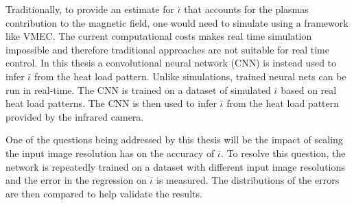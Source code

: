 Traditionally, to provide an estimate for $\bar{\iota}$ that accounts for the plasmas contribution to the magnetic field, one would need to simulate using a framework like VMEC. The current computational costs makes real time simulation impossible and therefore traditional approaches are not suitable for real time control. In this thesis a convolutional neural network (CNN) is instead used to infer $\bar{\iota}$ from the heat load pattern. Unlike simulations, trained neural nets can be run in real-time. The CNN is trained on a dataset of simulated $\bar{\iota}$ based on real heat load patterns. The CNN is then used to infer $\bar{\iota}$ from the heat load pattern provided by the infrared camera.

One of the questions being addressed by this thesis will be the impact of scaling the input image resolution has on the accuracy of $\bar{\iota}$. To resolve this question, the network is repeatedly trained on a dataset with different input image resolutions and the error in the regression on $\bar{\iota}$ is measured. The distributions of the errors are then compared to help validate the results.